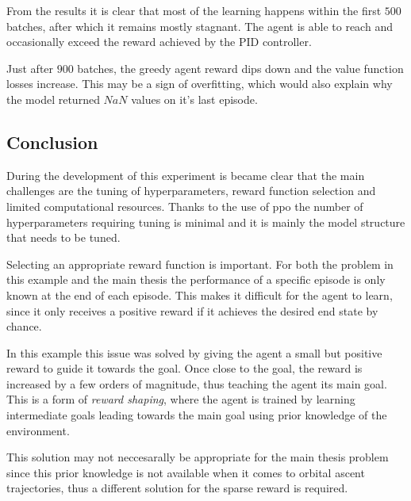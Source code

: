 From the results it is clear that most of the learning happens within the first $500$ batches, after which it remains mostly stagnant. The agent is able to reach and occasionally exceed the reward achieved by the PID controller.

Just after $900$ batches, the greedy agent reward dips down and the value function losses increase. This may be a sign of overfitting, which would also explain why the model returned $NaN$ values on it's last episode.


\subsection{Conclusion}
During the development of this experiment is became clear that the main challenges are the tuning of hyperparameters, reward function selection and limited computational resources. Thanks to the use of \acrshort{ppo} the number of hyperparameters requiring tuning is minimal and it is mainly the model structure that needs to be tuned. 

Selecting an appropriate reward function is important. For both the problem in this example and the main thesis the performance of a specific episode is only known at the end of each episode. This makes it difficult for the agent to learn, since it only receives a positive reward if it achieves the desired end state by chance.

In this example this issue was solved by giving the agent a small but positive reward to guide it towards the goal. Once close to the goal, the reward is increased by a few orders of magnitude, thus teaching the agent its main goal. This is a form of \emph{reward shaping}, where the agent is trained by learning intermediate goals leading towards the main goal using prior knowledge of the environment.

This solution may not neccesarally be appropriate for the main thesis problem since this prior knowledge is not available when it comes to orbital ascent trajectories, thus a different solution for the sparse reward is required.


 